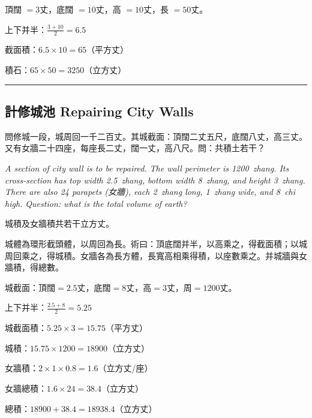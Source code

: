 \documentclass[11pt,a4paper]{article}
\newcommand{\longline}{\noindent\rule{\textwidth}{0.4pt}}
\begin{document}
\begin{working}
頂闊 $=3$丈，底闊 $=10$丈，高 $=10$丈，長 $=50$丈。

上下并半：$\displaystyle\frac{3+10}{2} = 6.5$

截面積：$6.5 \times 10 = 65$（平方丈）

積石：$65 \times 50 = 3250$（立方丈）
\end{working}

\vspace{0.5em}
\longline

\subsection{計修城池 \quad Repairing City Walls}

\begin{problem}
問修城一段，城周回一千二百丈。其城截面：頂闊二丈五尺，底闊八丈，高三丈。又有女牆二十四座，每座長二丈，闊一丈，高八尺。問：共積土若干？

\textit{A section of city wall is to be repaired. The wall perimeter is 1200~zhang. Its cross-section has top width 2.5~zhang, bottom width 8~zhang, and height 3~zhang. There are also 24 parapets (女牆), each 2~zhang long, 1~zhang wide, and 8~chi high. Question: what is the total volume of earth?}
\end{problem}

\begin{answer}
城積及女牆積共若干立方丈。
\end{answer}

\begin{method}
城體為環形截頭體，以周回為長。術曰：頂底闊并半，以高乘之，得截面積；以城周回乘之，得城積。女牆各為長方體，長寬高相乘得積，以座數乘之。并城牆與女牆積，得總數。
\end{method}

\begin{working}
城截面：頂闊$=2.5$丈，底闊$=8$丈，高$=3$丈，周$=1200$丈。

上下并半：$\displaystyle\frac{2.5+8}{2} = 5.25$

城截面積：$5.25 \times 3 = 15.75$（平方丈）

城積：$15.75 \times 1200 = 18900$（立方丈）

女牆積：$2 \times 1 \times 0.8 = 1.6$（立方丈/座）

女牆總積：$1.6 \times 24 = 38.4$（立方丈）

總積：$18900 + 38.4 = 18938.4$（立方丈）
\end{working}
\end{document}
